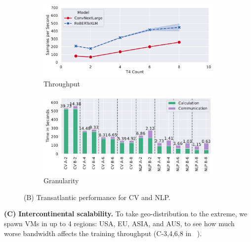 \begin{figure}
    \begin{subfigure}[c]{0.25\textwidth}
        \includegraphics[width=\textwidth]{figures/misc/geo-distributed-performance-US-EU}
        \vspace{-15pt}
        \caption{Throughput}
        \label{fig:geo-dist-us-eu-throughput}
    \end{subfigure}
    \begin{subfigure}[c]{0.22\textwidth}
        \includegraphics[width=\textwidth]{figures/misc/geo-distributed-performance-US-EU-granularity}  
        \vspace{-15pt}
        \caption{Granularity}
        \label{fig:geo-dist-us-eu-granularity}
    \end{subfigure}
    \vspace{-10pt}
    \caption{(B) Transatlantic performance for CV and NLP.}
    \label{fig:geo-dist-us-eu}
    \vspace*{-4mm}
\end{figure}
  
\textbf{(C) Intercontinental scalability. } To take geo-distribution to the extreme, we spawn VMs in up to 4 regions: USA, EU, ASIA, and AUS, to see how much worse bandwidth affects the training throughput (C-3,4,6,8 in ~).

